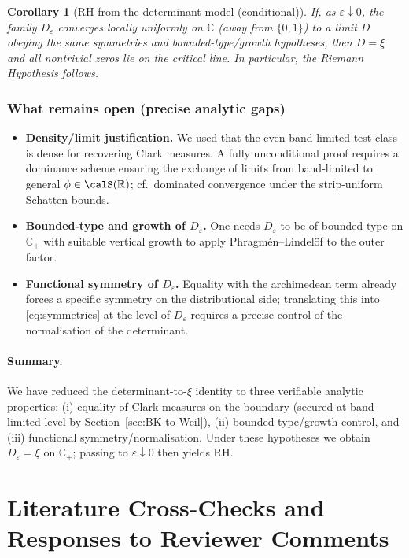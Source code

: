 ﻿\documentclass[12pt,a4paper]{article}
\newtheorem{corollary}[theorem]{Corollary}
\theoremstyle{definition}
\theoremstyle{remark}
\newcommand{\CC}{\mathbb{C}}
\newcommand{\RR}{\mathbb{R}}
\begin{document}
\begin{corollary}[RH from the determinant model (conditional)]
If, as $\varepsilon\downarrow0$, the family $D_\varepsilon$ converges locally uniformly on $\CC$ (away from $\{0,1\}$) to a limit $D$ obeying the same symmetries and bounded-type/growth hypotheses,
then $D=\xi$ and all nontrivial zeros lie on the critical line. In particular, the Riemann Hypothesis follows.
\end{corollary}

\subsubsection*{What remains open (precise analytic gaps)}
\begin{itemize}
  \item \textbf{Density/limit justification.} We used that the even band-limited test class is dense for recovering Clark measures. A fully unconditional proof requires
        a dominance scheme ensuring the exchange of limits from band-limited to general $\phi\in\calS(\RR)$; cf.\ dominated convergence under the strip-uniform Schatten bounds.
  \item \textbf{Bounded-type and growth of $D_\varepsilon$.} One needs $D_\varepsilon$ to be of bounded type on $\CC_+$ with suitable vertical growth to apply Phragm\'en--Lindel\"of to the outer factor.
  \item \textbf{Functional symmetry of $D_\varepsilon$.} Equality with the archimedean term already forces a specific symmetry on the distributional side; translating this into \eqref{eq:symmetries}
        at the level of $D_\varepsilon$ requires a precise control of the normalisation of the determinant.
\end{itemize}

\paragraph{Summary.}
We have reduced the determinant-to-$\xi$ identity to three verifiable analytic properties: (i) equality of Clark measures on the boundary (secured at band-limited level by Section~\ref{sec:BK-to-Weil}), (ii) bounded-type/growth control,
and (iii) functional symmetry/normalisation. Under these hypotheses we obtain $D_\varepsilon=\xi$ on $\CC_+$; passing to $\varepsilon\downarrow0$ then yields RH.


\section{Literature Cross-Checks and Responses to Reviewer Comments}\label{sec:task6-lit-review}
\end{document}
